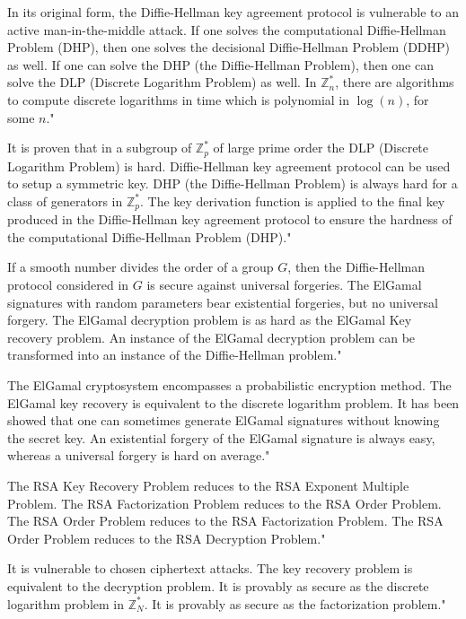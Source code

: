 {In its original form, the Diffie-Hellman key agreement protocol is vulnerable to an active man-in-the-middle attack.}
{If one solves the computational Diffie-Hellman Problem (DHP), then one solves the decisional Diffie-Hellman Problem (DDHP) as well.}
{If one can solve the DHP (the Diffie-Hellman Problem), then one can solve the DLP (Discrete Logarithm Problem) as well.}
{In $\mathbb{Z}_n^{*}$, there are algorithms to compute discrete logarithms in time which is polynomial in $\log(n)$, for some $n$."}

{It is proven that in a subgroup of $\mathbb{Z}_p^*$ of large prime order the DLP (Discrete Logarithm Problem) is hard.}
{Diffie-Hellman key agreement protocol can be used to setup a symmetric key.}
{DHP (the Diffie-Hellman Problem) is always hard for a class of generators in $\mathbb{Z}_p^*$.}
{The key derivation function is applied to the final key produced in the Diffie-Hellman key agreement protocol to ensure the hardness of the computational Diffie-Hellman Problem (DHP)."}

{If a smooth number divides the order of a group $G$, then the Diffie-Hellman protocol considered in $G$ is secure against universal forgeries.}
{The ElGamal signatures with random parameters bear existential forgeries, but no universal forgery.}
{The ElGamal decryption problem is as hard as the ElGamal Key recovery problem.}
{An instance of the ElGamal decryption problem can be transformed into an instance of the Diffie-Hellman problem."}

{The ElGamal cryptosystem encompasses a probabilistic encryption method.}
{The ElGamal key recovery is equivalent to the discrete logarithm problem.}
{It has been showed that one can sometimes generate ElGamal signatures without knowing the secret key.}
{An existential forgery of the ElGamal signature is always easy, whereas a universal forgery is hard on average."}

{The RSA Key Recovery Problem reduces to the RSA Exponent Multiple Problem.}
{The RSA Factorization Problem reduces to the RSA Order Problem.}
{The RSA Order Problem reduces to the RSA Factorization Problem.}
{The RSA Order Problem reduces to the RSA Decryption Problem."}

{It is vulnerable to chosen ciphertext attacks.}
{The key recovery problem is equivalent to the decryption problem.}
{It is provably as secure as the discrete logarithm problem in $\mathbb{Z}_N^*$.}
{It is provably as secure as the factorization problem."}

